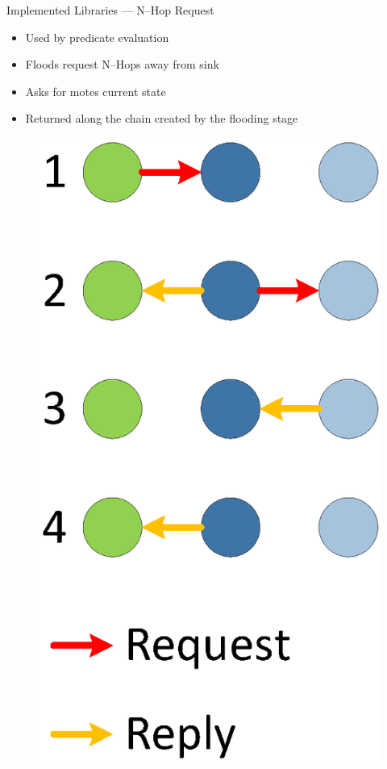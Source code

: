 \documentclass[usenames,dvipsnames]{beamer}
\begin{document}
\begin{frame}{Implemented Libraries --- N--Hop Request}
	\begin{itemize}
		\item Used by predicate evaluation
		\item Floods request N--Hops away from sink
		\item Asks for motes current state
		\item Returned along the chain created by the flooding stage
	\end{itemize}

\begin{figure}[H]
\includegraphics[scale=0.3]{../Report/Diagrams/n-hop-flood-req-reply.eps}\hspace{1em}

\end{figure}
\end{frame}
\end{document}
